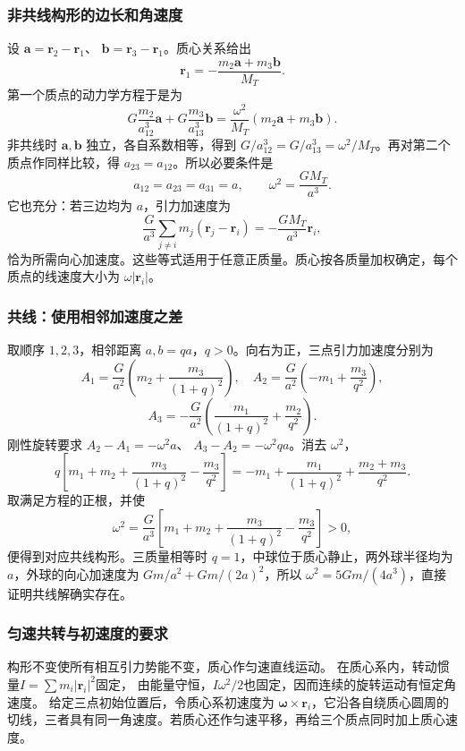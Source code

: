 \documentclass[UTF8,fontset=fandol,a4paper,11pt]{ctexart}
\newcommand{\vect}[1]{\bm{#1}}
\begin{document}
\subsubsection*{非共线构形的边长和角速度}
设 $\vect a=\vect r_2-\vect r_1$、
$\vect b=\vect r_3-\vect r_1$。质心关系给出
\[
\vect r_1=-\frac{m_2\vect a+m_3\vect b}{M_T}.
\]
第一个质点的动力学方程于是为
\[
G\frac{m_2}{a_{12}^3}\vect a+
G\frac{m_3}{a_{13}^3}\vect b
=\frac{\omega^2}{M_T}(m_2\vect a+m_3\vect b).
\]
非共线时 $\vect a,\vect b$ 独立，各自系数相等，得到
$G/a_{12}^3=G/a_{13}^3=\omega^2/M_T$。再对第二个质点作同样比较，得 $a_{23}=a_{12}$。所以必要条件是
\[
\boxed{a_{12}=a_{23}=a_{31}=a,\qquad
\omega^2=\frac{GM_T}{a^3}}.
\]
它也充分：若三边均为 $a$，引力加速度为
\[
\frac G{a^3}\sum_{j\ne i}m_j(\vect r_j-\vect r_i)
=-\frac{GM_T}{a^3}\vect r_i,
\]
恰为所需向心加速度。这些等式适用于任意正质量。质心按各质量加权确定，每个质点的线速度大小为 $\omega|\vect r_i|$。

\subsubsection*{共线：使用相邻加速度之差}
取顺序 $1,2,3$，相邻距离 $a,b=qa$，$q>0$。向右为正，三点引力加速度分别为
\[
A_1=\frac G{a^2}\left(m_2+\frac{m_3}{(1+q)^2}\right),
\quad
A_2=\frac G{a^2}\left(-m_1+\frac{m_3}{q^2}\right),
\]
\[
A_3=-\frac G{a^2}\left(\frac{m_1}{(1+q)^2}
+\frac{m_2}{q^2}\right).
\]
刚性旋转要求 $A_2-A_1=-\omega^2a$、
$A_3-A_2=-\omega^2qa$。消去 $\omega^2$，
\[
q\left[m_1+m_2+\frac{m_3}{(1+q)^2}
-\frac{m_3}{q^2}\right]
=-m_1+\frac{m_1}{(1+q)^2}+\frac{m_2+m_3}{q^2}.
\]
取满足方程的正根，并使
\[
\omega^2=\frac G{a^3}\left[m_1+m_2+
\frac{m_3}{(1+q)^2}-\frac{m_3}{q^2}\right]>0,
\]
便得到对应共线构形。三质量相等时 $q=1$，中球位于质心静止，两外球半径均为 $a$，外球的向心加速度为 $Gm/a^2+Gm/(2a)^2$，所以
$\omega^2=5Gm/(4a^3)$，直接证明共线解确实存在。


\subsubsection*{匀速共转与初速度的要求}
构形不变使所有相互引力势能不变，质心作匀速直线运动。
在质心系内，转动惯量$I=\sum m_i|\vect r_i|^2$固定，
由能量守恒，$I\omega^2/2$也固定，因而连续的旋转运动有恒定角速度。
给定三点初始位置后，令质心系初速度为 $\vect\omega\times\vect r_i$，它沿各自绕质心圆周的切线，三者具有同一角速度。若质心还作匀速平移，再给三个质点同时加上质心速度。
\end{document}
